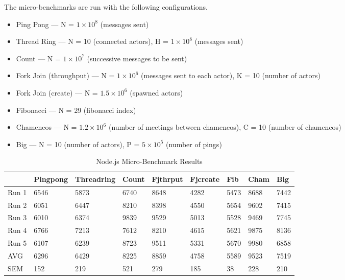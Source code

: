 \documentclass[oneside]{um-fict}
\begin{document}
The micro-benchmarks are run with the following configurations.
\begin{itemize}
    \item Ping Pong --- N = $1\times10^8$ (messages sent)
    \item Thread Ring --- N = 10 (connected actors), H = $1\times10^8$ (messages sent)
    \item Count --- N = $1\times10^7$ (successive messages to be sent)
    \item Fork Join (throughput) --- N = $1\times10^6$ (messages sent to each actor), K = 10 (number of actors)
    \item Fork Join (create) --- N = $1.5\times10^6$ (spawned actors)
    \item Fibonacci --- N = 29 (fibonacci index)
    \item Chameneos --- N = $1.2\times10^6$ (number of meetings between chameneos), C = 10 (number of chameneos)
    \item Big --- N = 10 (number of actors), P = $5\times10^5$ (number of pings) 
\end{itemize}
\begin{table}[H]
    \begin{center}
    \begin{tabular}{|l|llllllll|}
    \hline
          & Pingpong & Threadring & Count  & Fjthrput & Fjcreate & Fib    & Cham & Big    \\ \hline
    Run 1 & 6546     & 5873       & 6740   & 8648     & 4282     & 5473   & 8688      & 7442   \\
    Run 2 & 6051     & 6447       & 8210   & 8398     & 4550     & 5654   & 9602      & 7415   \\
    Run 3 & 6010     & 6374       & 9839   & 9529     & 5013     & 5528   & 9469      & 7745   \\
    Run 4 & 6766     & 7213       & 7612   & 8210     & 4615     & 5621   & 9875      & 8136   \\
    Run 5 & 6107     & 6239       & 8723   & 9511     & 5331     & 5670   & 9980      & 6858   \\ \hline
    AVG   & 6296   & 6429     & 8225 & 8859   & 4758   & 5589 & 9523    & 7519 \\
    SEM   & 152   & 219     & 521 & 279   & 185   & 38  & 228    & 210  \\ \hline
    \end{tabular}
    \caption{Node.js Micro-Benchmark Results}\label{tab:nodemicro}
\end{center}
\end{table}
\end{document}

